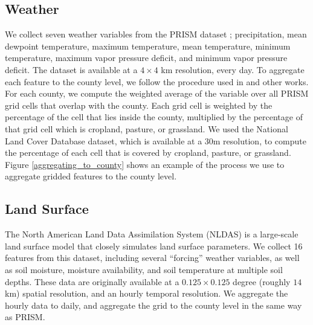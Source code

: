 

\subsection{Weather}

We collect seven weather variables from the PRISM dataset \cite{daly2013prism}; precipitation, mean dewpoint temperature, maximum temperature, mean temperature, minimum temperature, maximum vapor pressure deficit, and minimum vapor pressure deficit. The dataset is available at a $4 \times 4$ km resolution, every day. To aggregate each feature to the county level, we follow the procedure used in \cite{ortiz2021anthropogenic} and other works. For each county, we compute the weighted average of the variable over all PRISM grid cells that overlap with the county. Each grid cell is weighted by the percentage of the cell that lies inside the county, multiplied by the percentage of that grid cell which is cropland, pasture, or grassland. We used the National Land Cover Database \cite{nlcd} dataset, which is available at a 30m resolution, to compute the percentage of each cell that is covered by cropland, pasture, or grassland. Figure \ref{aggregating_to_county} shows an example of the process we use to aggregate gridded features to the county level.



\subsection{Land Surface}

The North American Land Data Assimilation System (NLDAS) \cite{xia2012continental} is a large-scale land surface model that closely simulates land surface parameters. We collect 16 features from this dataset, including several ``forcing'' weather variables, as well as soil moisture, moisture availability, and soil temperature at multiple soil depths. These data are originally available at a $0.125 \times 0.125$ degree (roughly $14$ km) spatial resolution, and an hourly temporal resolution. We aggregate the hourly data to daily, and aggregate the grid to the county level in the same way as PRISM. 

